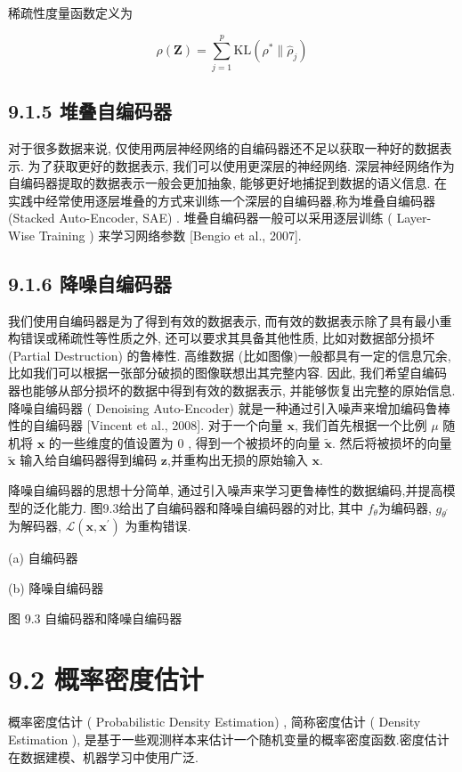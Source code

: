 \documentclass[10pt]{article}
\begin{document}
稀疏性度量函数定义为


\begin{equation*}
\rho(\boldsymbol{Z})=\sum_{j=1}^{p} \mathrm{KL}\left(\rho^{*} \| \hat{\rho}_{j}\right) \tag{9.26}
\end{equation*}


\subsection*{9.1.5 堆叠自编码器}
对于很多数据来说, 仅使用两层神经网络的自编码器还不足以获取一种好的数据表示. 为了获取更好的数据表示, 我们可以使用更深层的神经网络. 深层神经网络作为自编码器提取的数据表示一般会更加抽象, 能够更好地捕捉到数据的语义信息. 在实践中经常使用逐层堆叠的方式来训练一个深层的自编码器,称为堆叠自编码器 (Stacked Auto-Encoder, SAE) . 堆叠自编码器一般可以采用逐层训练 ( Layer-Wise Training ) 来学习网络参数 [Bengio et al., 2007].

\subsection*{9.1.6 降噪自编码器}
我们使用自编码器是为了得到有效的数据表示, 而有效的数据表示除了具有最小重构错误或稀疏性等性质之外, 还可以要求其具备其他性质, 比如对数据部分损坏 (Partial Destruction) 的鲁棒性. 高维数据 (比如图像)一般都具有一定的信息冗余, 比如我们可以根据一张部分破损的图像联想出其完整内容. 因此, 我们希望自编码器也能够从部分损坏的数据中得到有效的数据表示, 并能够恢复出完整的原始信息.\\
降噪自编码器 ( Denoising Auto-Encoder) 就是一种通过引入噪声来增加编码鲁棒性的自编码器 [Vincent et al., 2008]. 对于一个向量 $\boldsymbol{x}$, 我们首先根据一个比例 $\mu$ 随机将 $\boldsymbol{x}$ 的一些维度的值设置为 0 , 得到一个被损坏的向量 $\tilde{\boldsymbol{x}}$. 然后将被损坏的向量 $\tilde{\boldsymbol{x}}$ 输入给自编码器得到编码 $\boldsymbol{z}$,并重构出无损的原始输入 $\boldsymbol{x}$.

降噪自编码器的思想十分简单, 通过引入噪声来学习更鲁棒性的数据编码,并提高模型的泛化能力. 图9.3给出了自编码器和降噪自编码器的对比, 其中 $f_{\theta}$为编码器, $g_{\theta^{\prime}}$ 为解码器, $\mathcal{L}\left(\boldsymbol{x}, \boldsymbol{x}^{\prime}\right)$ 为重构错误.



(a) 自编码器



(b) 降噪自编码器

图 9.3 自编码器和降噪自编码器

\section*{9.2 概率密度估计}
概率密度估计 ( Probabilistic Density Estimation) , 简称密度估计 ( Density Estimation ), 是基于一些观测样本来估计一个随机变量的概率密度函数.密度估计在数据建模、机器学习中使用广泛.
\end{document}
